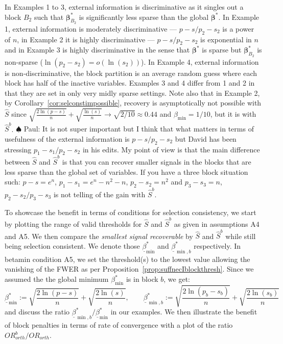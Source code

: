 \documentclass[aos]{imsart}
\theoremstyle{plain}
\newcommand{\paul}[1]{{\small{\color{green} \sf $\spadesuit$ Paul: #1}}}
\newcommand{\bs}{\boldsymbol}
\begin{document}
In Examples 1 to 3, external information is discriminative as it singles out a block $B_2$ such that $\bs\beta^*_{B_2}$ is significantly less sparse than the global $\bs\beta^*$. In Example 1, external information is moderately discriminative --- $p-s/p_2-s_2$ is a power of $n$, in Example 2 it is highly discriminative --- $p-s/p_2-s_2$ is exponential in $n$ and in Example 3 is highly discriminative in the sense that $\bs\beta^*$ is sparse but $\bs\beta^*_{B_2}$ is non-sparse ($\ln(p_2-s_2)=o(\ln(s_2))$). In Example 4, external information is non-discriminative, the block partition is an average random guess where each block has half of the inactive variables. Examples 3 and 4 differ from 1 and 2 in that they are set in only very midly sparse settings. Note also that in Example 2, by Corollary~\ref{cor:selconstimpossible}, recovery is asymptotically not possible with $\hat{S}$ since $\sqrt{\frac{2\ln(p-s)}{n}}+\sqrt{\frac{\ln(s)}{n}} \to \sqrt{2/10} \approx 0.44$ and $\beta_{\min}=1/10$, but it is with $\hat S^b$. 
\paul{It is not super important but I think that what matters in terms of usefulness of the external information is $p-s/p_2-s_2$ but David has been stressing $p_1-s_1/p_2-s_2$ in his edits. My point of view is that the main difference between $\hat S$ and $\hat S^b$ is that you can recover smaller signals in the blocks that are less sparse than the global set of variables. If you have a three block situation such: $p-s=e^n$, $p_1-s_1=e^n-n^2-n$, $p_2-s_2=n^2$ and $p_3-s_3=n$, $p_2-s_2/p_3-s_3$ is not telling of the gain with $\hat S^b$.}

To showcase the benefit in terms of conditions for selection consistency, we start by plotting the range of valid thresholds for $\hat{S}$ and $\hat{S}^{b}$ as given in assumptions A4 and A5. We then compare the \textit{smallest signal recoverable} by $\hat S$ and $\hat S^b$ while still being selection consistent. We denote those $\underline{\beta}_{\min}^{*}$ and $\underline{\beta}_{\min,b}^{*}$ respectively. In betamin condition A5, we set the threshold(s) to the lowest value allowing the vanishing of the FWER as per Proposition~\ref{prop:suffnecIblockthresh}. Since we assumed the the global minimum $\beta_{\min}^*$ is in block $b$, we get:
\begin{equation}\label{eq:betaminbardef}
    \underline{\beta}_{\min}^{*} := \sqrt{\frac{2\ln(p-s)}{n}} + \sqrt{\frac{2\ln(s)}{n}},\qquad
    \underline{\beta}^{*}_{\min,b} := \sqrt{\frac{2\ln(p_b-s_b)}{n}} + \sqrt{\frac{2\ln(s_b)}{n}}
\end{equation} 
and discuss the ratio $\underline{\beta}^{*}_{\min,b}/\underline{\beta}_{\min}^{*}$ in our examples. We then illustrate the benefit of block penalties in terms of rate of convergence with a plot of the ratio ${OR}^b_{orth}/{OR}_{orth}$.
\end{document}
